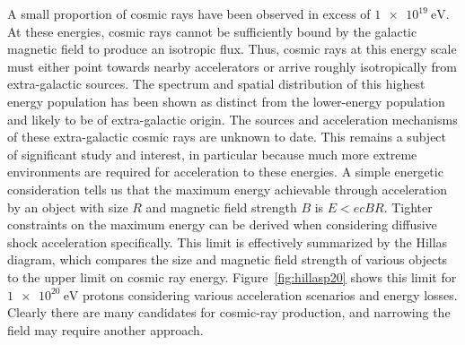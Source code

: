 A small proportion of cosmic rays have been observed in excess of $\SI{1e19}\eV$.
At these energies, cosmic rays cannot be sufficiently bound by the galactic magnetic field to produce an isotropic flux.
Thus, cosmic rays at this energy scale must either point towards nearby accelerators or arrive roughly isotropically from extra-galactic sources.
The spectrum and spatial distribution of this highest energy population has been shown as distinct from the lower-energy population and likely to be of extra-galactic origin.
The sources and acceleration mechanisms of these extra-galactic cosmic rays are unknown to date.
This remains a subject of significant study and interest, in particular because much more extreme environments are required for acceleration to these energies.
A simple energetic consideration tells us that the maximum energy achievable through acceleration by an object with size $R$ and magnetic field strength $B$ is $E<ecBR$.
Tighter constraints on the maximum energy can be derived when considering diffusive shock acceleration specifically.
This limit is effectively summarized by the Hillas diagram, which compares the size and magnetic field strength of various objects to the upper limit on cosmic ray energy.
Figure~\ref{fig:hillasp20} shows this limit for $\SI{1e20}\eV$ protons considering various acceleration scenarios and energy losses.
Clearly there are many candidates for cosmic-ray production, and narrowing the field may require another approach.

